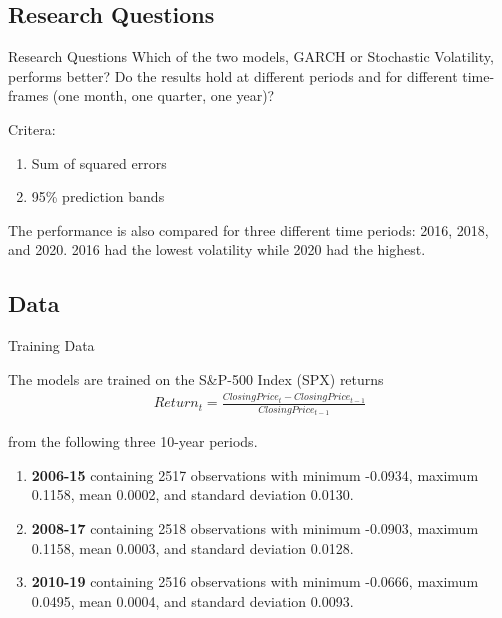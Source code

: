 \documentclass[11pt]{beamer}
\begin{document}
\subsection{Research Questions}
\begin{frame}{Research Questions}
Which of the two models, GARCH or Stochastic Volatility, performs better? Do the results hold at different periods and for different time-frames (one month, one quarter, one year)? 

Critera:
\begin{enumerate}
\item Sum of squared errors
\item 95\% prediction bands
\end{enumerate}

The performance is also compared for three different time periods: 2016, 2018, and 2020. 2016 had the lowest volatility while 2020 had the highest.

\end{frame}
\subsection{Data}
\begin{frame}{Training Data}

The models are trained on the S\&P-500 Index (SPX) returns
\begin{align}
Return_{t} = \frac{ClosingPrice_{t} - ClosingPrice_{t-1}}{ClosingPrice_{t-1}} \nonumber
\end{align}

from the following three 10-year periods. 
\begin{enumerate}
\item \textbf{2006-15} containing 2517 observations with minimum -0.0934, maximum 0.1158, mean 0.0002, and standard deviation 0.0130.

\item \textbf{2008-17} containing 2518 observations with minimum -0.0903, maximum 0.1158, mean 0.0003, and standard deviation 0.0128.

\item \textbf{2010-19} containing 2516 observations with minimum -0.0666, maximum 0.0495, mean 0.0004, and standard deviation 0.0093.
\end{enumerate}


\end{frame}
\end{document}
